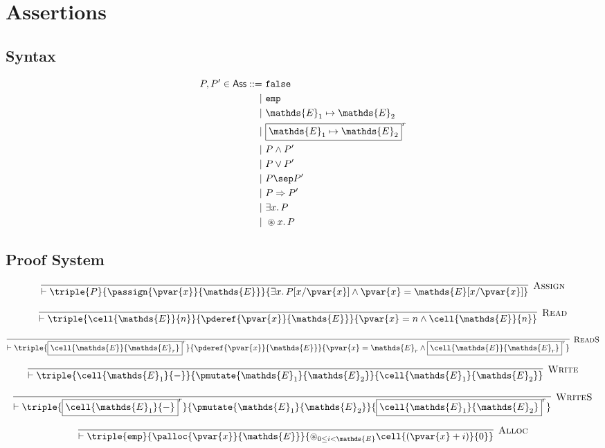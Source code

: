 \section{Assertions}

\subsection{Syntax}

\begin{align*}
P, P' \in \mathsf{Ass} ::=&
\ \mathtt{false} \\
|&\ \mathtt{emp} \\
|&\ \mathds{E}_1 \mapsto \mathds{E}_2 \\
|&\ \boxed{\mathds{E}_1 \mapsto \mathds{E}_2}^r \\
|&\ P \land P' \\
|&\ P \lor P' \\
|&\ P \sep P' \\
|&\ P \Rightarrow P' \\
|&\ \exists x \ldotp P \\
|&\ \circledast x \ldotp P
\end{align*}

\subsection{Proof System}

\[
\infer[\textsc{Assign}]
{
	\vdash \triple
	{P}
	{\passign{\pvar{x}}{\mathds{E}}}
	{\exists x\ldotp P[x/\pvar{x}] \land \pvar{x} = \mathds{E}[x/\pvar{x}]}
}
{}
\]

\[
\infer[\textsc{Read}]
{
	\vdash \triple
	{\cell{\mathds{E}}{n}}
	{\pderef{\pvar{x}}{\mathds{E}}}
	{\pvar{x} = n \land \cell{\mathds{E}}{n}}
}
{}
\]

\[
\infer[\textsc{ReadS}]
{
	\vdash \triple
	{\boxed{\cell{\mathds{E}}{\mathds{E}_r}}^r}
	{\pderef{\pvar{x}}{\mathds{E}}}
	{\pvar{x} = \mathds{E}_r \land \boxed{\cell{\mathds{E}}{\mathds{E}_r}}^r}
}
{}
\]

\[
\infer[\textsc{Write}]
{
	\vdash \triple
	{\cell{\mathds{E}_1}{-}}
	{\pmutate{\mathds{E}_1}{\mathds{E}_2}}
	{\cell{\mathds{E}_1}{\mathds{E}_2}}
}
{}
\]

\[
\infer[\textsc{WriteS}]
{
	\vdash \triple
	{\boxed{\cell{\mathds{E}_1}{-}}^r}
	{\pmutate{\mathds{E}_1}{\mathds{E}_2}}
	{\boxed{\cell{\mathds{E}_1}{\mathds{E}_2}}^r}
}
{}
\]

\[
\infer[\textsc{Alloc}]
{
	\vdash \triple
	{\mathtt{emp}}
	{\palloc{\pvar{x}}{\mathds{E}}}
	{\circledast_{0 \leq i < \mathds{E}}\cell{(\pvar{x} + i)}{0}}
}
{}
\]

